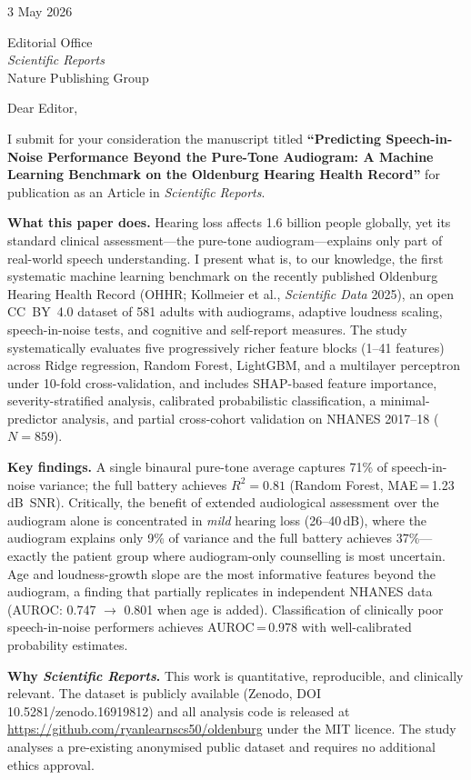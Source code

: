\documentclass[12pt,a4paper]{article}
\begin{document}
3 May 2026

Editorial Office\\
\textit{Scientific Reports}\\
Nature Publishing Group

\bigskip

Dear Editor,

I submit for your consideration the manuscript titled \textbf{``Predicting
Speech-in-Noise Performance Beyond the Pure-Tone Audiogram: A Machine
Learning Benchmark on the Oldenburg Hearing Health Record''} for publication
as an Article in \textit{Scientific Reports}.

\textbf{What this paper does.}
Hearing loss affects 1.6 billion people globally, yet its standard clinical
assessment---the pure-tone audiogram---explains only part of real-world
speech understanding.  I present what is, to our knowledge, the first
systematic machine learning benchmark on the recently published Oldenburg
Hearing Health Record (OHHR; Kollmeier et al., \textit{Scientific Data}
2025), an open CC~BY~4.0 dataset of 581 adults with audiograms, adaptive
loudness scaling, speech-in-noise tests, and cognitive and self-report
measures.  The study systematically evaluates five progressively richer
feature blocks (1--41 features) across Ridge regression, Random Forest,
LightGBM, and a multilayer perceptron under 10-fold cross-validation, and
includes SHAP-based feature importance, severity-stratified analysis,
calibrated probabilistic classification, a minimal-predictor analysis, and
partial cross-cohort validation on NHANES 2017--18 ($N=859$).

\textbf{Key findings.}
A single binaural pure-tone average captures 71\% of speech-in-noise
variance; the full battery achieves $R^2=0.81$ (Random Forest,
MAE\,=\,1.23\,dB~SNR).  Critically, the benefit of extended audiological
assessment over the audiogram alone is concentrated in \emph{mild} hearing
loss (26--40\,dB), where the audiogram explains only 9\% of variance and
the full battery achieves 37\%---exactly the patient group where
audiogram-only counselling is most uncertain.  Age and loudness-growth
slope are the most informative features beyond the audiogram, a finding
that partially replicates in independent NHANES data (AUROC: 0.747
$\to$ 0.801 when age is added).  Classification of clinically poor
speech-in-noise performers achieves AUROC\,=\,0.978 with well-calibrated
probability estimates.

\textbf{Why \textit{Scientific Reports}.}
This work is quantitative, reproducible, and clinically relevant.  The
dataset is publicly available (Zenodo, DOI 10.5281/zenodo.16919812) and
all analysis code is released at
\url{https://github.com/ryanlearnscs50/oldenburg} under the MIT licence.
The study analyses a pre-existing anonymised public dataset and requires
no additional ethics approval.
\end{document}
